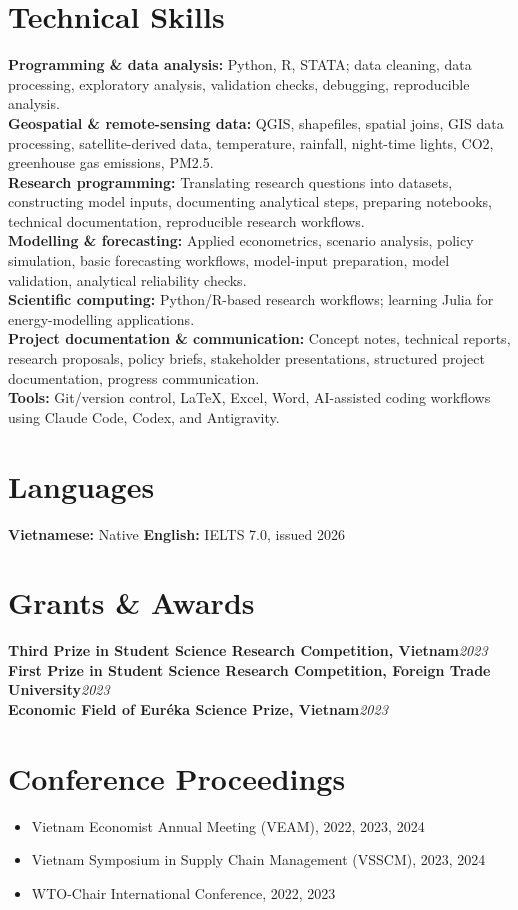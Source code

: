 \documentclass[10pt]{article}
\begin{document}
\section{Technical Skills}
\textbf{Programming \& data analysis:} Python, R, STATA; data cleaning, data processing, exploratory analysis, validation checks, debugging, reproducible analysis.\\
\textbf{Geospatial \& remote-sensing data:} QGIS, shapefiles, spatial joins, GIS data processing, satellite-derived data, temperature, rainfall, night-time lights, CO2, greenhouse gas emissions, PM2.5.\\
\textbf{Research programming:} Translating research questions into datasets, constructing model inputs, documenting analytical steps, preparing notebooks, technical documentation, reproducible research workflows.\\
\textbf{Modelling \& forecasting:} Applied econometrics, scenario analysis, policy simulation, basic forecasting workflows, model-input preparation, model validation, analytical reliability checks.\\
\textbf{Scientific computing:} Python/R-based research workflows; learning Julia for energy-modelling applications.\\
\textbf{Project documentation \& communication:} Concept notes, technical reports, research proposals, policy briefs, stakeholder presentations, structured project documentation, progress communication.\\
\textbf{Tools:} Git/version control, \LaTeX, Excel, Word, AI-assisted coding workflows using Claude Code, Codex, and Antigravity.

\section{Languages}
\textbf{Vietnamese:} Native \quad \textbf{English:} IELTS 7.0, issued 2026

\section{Grants \& Awards}
\textbf{Third Prize in Student Science Research Competition, Vietnam}\hfill\emph{2023}\\
\textbf{First Prize in Student Science Research Competition, Foreign Trade University}\hfill\emph{2023}\\
\textbf{Economic Field of Eur\'eka Science Prize, Vietnam}\hfill\emph{2023}

\section{Conference Proceedings}
\begin{itemize}
\item Vietnam Economist Annual Meeting (VEAM), 2022, 2023, 2024
\item Vietnam Symposium in Supply Chain Management (VSSCM), 2023, 2024
\item WTO-Chair International Conference, 2022, 2023
\end{itemize}
\end{document}
